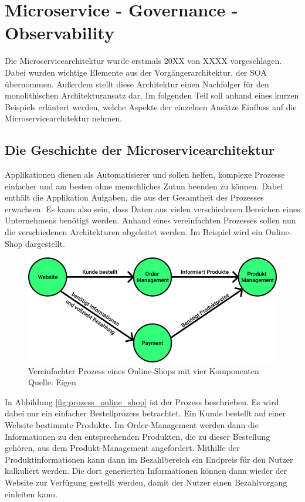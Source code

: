 \chapter{Microservice - Governance - Observability}

Die Microservicearchitektur wurde erstmals 20XX von XXXX  vorgeschlagen. Dabei wurden wichtige Elemente aus der Vorgängerarchitektur, der \ac{SOA} übernommen. Außerdem stellt diese Architektur einen Nachfolger für den monolithischen Architekturansatz dar. Im folgenden Teil soll anhand eines kurzen Beispiels erläutert werden, welche Aspekte der einzelnen Ansätze Einfluss auf die Microservicearchitektur nehmen.\autocites{Ren2018}{Mazlami2017}{Escobar2016}

\section{Die Geschichte der Microservicearchitektur}

Applikationen dienen als Automatisierer und sollen helfen, komplexe Prozesse einfacher und am besten ohne menschliches Zutun beenden zu können. Dabei enthält die Applikation Aufgaben, die aus der Gesamtheit des Prozesses erwachsen. Es kann also sein, dass Daten aus vielen verschiedenen Bereichen eines Unternehmens benötigt werden. Anhand eines vereinfachten Prozesses sollen nun die verschiedenen Architekturen abgeleitet werden. Im Beispiel wird ein Online-Shop dargestellt.

\begin{figure}[h]
	\centering
	\includegraphics[width=1.0\linewidth]{img/prozess_eCommernce.png}
	\caption[Prozess Online-Shop]{Vereinfachter Prozess eines Online-Shops mit vier Komponenten\\ Quelle: Eigen}
	\label{fig:prozess_online_shop}
\end{figure}

In Abbildung \vref{fig:prozess_online_shop} ist der Prozess beschrieben. Es wird dabei nur ein einfacher Bestellprozess betrachtet. Ein Kunde bestellt auf einer Website bestimmte Produkte. Im Order-Management werden dann die Informationen zu den entsprechenden Produkten, die zu dieser Bestellung gehören, aus dem Produkt-Management angefordert. Mithilfe der Produktinformationen kann dann im Bezahlbereich ein Endpreis für den Nutzer kalkuliert werden. Die dort generierten Informationen können dann wieder der Website zur Verfügung gestellt werden, damit der Nutzer einen Bezahlvorgang einleiten kann.

